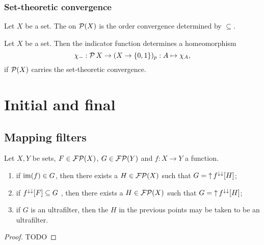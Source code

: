 \subsection{Set-theoretic convergence}
\begin{definition}
Let $X$ be a set. The  on $\operatorname{\mathcal{P}}(X)$ is the order convergence determined by $\subseteq$.
\end{definition}

\begin{lemma} \label{indicatorFunctionHomeomorphism}
Let $X$ be a set. Then the indicator function determines a homeomorphism
\[ \chi_{-}: \operatorname{\mathcal{P}}{X} \to (X\to \{0,1\})_p: A\mapsto \chi_{A}, \]
if $\operatorname{\mathcal{P}}(X)$ carries the set-theoretic convergence.
\end{lemma}



\chapter{Initial and final}

\section{Mapping filters}

\begin{proposition} \label{preimageFilter}
Let $X,Y$ be sets, $F\in\operatorname{\mathcal{FP}}(X)$, $G\in\operatorname{\mathcal{FP}}(Y)$ and $f: X\to Y$ a function.
\begin{enumerate}
\item if $\operatorname{im}(f)\in G$, then there exists a $H\in\operatorname{\mathcal{FP}}(X)$ such that $G = \operatorname{\uparrow} f^{\downarrow\downarrow}[H]$;
\item if $f^{\downarrow\downarrow}[F]\subseteq G$ , then there exists a $H\in\operatorname{\mathcal{FP}}(X)$ such that $G = \operatorname{\uparrow} f^{\downarrow\downarrow}[H]$;
\item if $G$ is an ultrafilter, then the $H$ in the previous points may be taken to be an ultrafilter.
\end{enumerate}
\end{proposition}
\begin{proof}
TODO
\end{proof}


